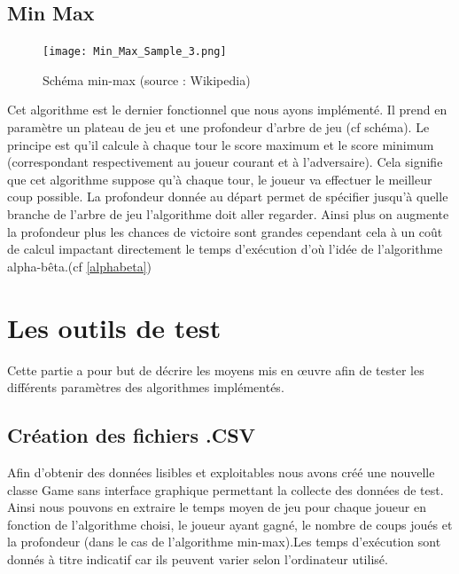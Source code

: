 \documentclass{report}
\begin{document}
		\section{Min Max}
		 \begin{figure}[!b]
             	    \caption{Schéma min-max (source : Wikipedia)}
             	    \label{minmaxWikipedia}
             	    \texttt{[image: Min\_Max\_Sample\_3.png]}
             	\end{figure}
        Cet algorithme est le dernier fonctionnel que nous ayons implémenté. Il prend en paramètre un plateau de jeu et une profondeur d'arbre de jeu (cf schéma).
        Le principe est qu'il calcule à chaque tour le score maximum et le score minimum (correspondant respectivement au joueur courant et à l'adversaire).
        Cela signifie que cet algorithme suppose qu'à chaque tour, le joueur va effectuer le meilleur coup possible.
        La profondeur donnée au départ permet de spécifier jusqu'à quelle branche de l'arbre de jeu l'algorithme doit aller regarder.
        Ainsi plus on augmente la profondeur plus les chances de victoire sont grandes cependant cela à un coût de calcul impactant directement le temps d'exécution d'où l'idée de l'algorithme alpha-bêta.(cf \ref{alphabeta})
	\chapter{Les outils de test}
	Cette partie a pour but de décrire les moyens mis en œuvre afin de tester les différents paramètres des algorithmes implémentés. 
	\section{Création des fichiers .CSV}
	\label{fichierCSV}
	Afin d'obtenir des données lisibles et exploitables nous avons créé une nouvelle classe Game sans interface graphique permettant la collecte des données de test.
	Ainsi nous pouvons en extraire le temps moyen de jeu pour chaque joueur en fonction de l'algorithme choisi, le joueur ayant gagné,
	le nombre de coups joués et la profondeur (dans le cas de l'algorithme min-max).Les temps d'exécution sont donnés à titre indicatif car ils peuvent varier selon l'ordinateur utilisé.
\end{document}
